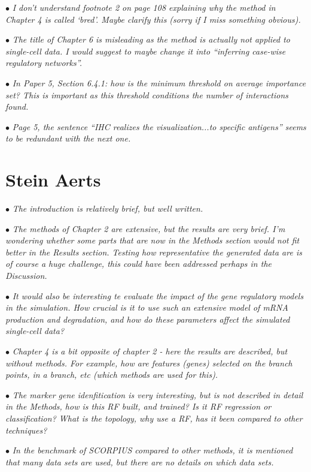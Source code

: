 \documentclass[10pt]{article}
\newcommand{\exam}[2][\  ]{\hspace{0pt}\marginpar{\color{red}#1}$\bullet$ \textit{#2}}
\newcommand{\imp}[1]{{\color{red} #1}}
\newcommand{\bigexclaim}{\raisebox{-0.1em}{\BigTriangleUp}\hspace{-0.32em}\llap{\small\textbf{!}}\hspace{0.32em}}
\newcommand{\tagimp}{\bigexclaim}
\newcommand{\tagtime}{{\Large $\hourglass$}}
\begin{document}
{{\exam{I don’t understand footnote 2 on page 108 explaining why the method in Chapter 4 is called
	‘bred’. Maybe clarify this (sorry if I miss something obvious).}

\exam{The title of Chapter 6 is misleading as the method is actually not applied to single-cell data.
	I would suggest to maybe change it into “inferring case-wise regulatory networks”.}

\exam{In Paper 5, Section 6.4.1: how is the minimum threshold on average importance set? This is
	important as this threshold conditions the number of interactions found.}

\exam{Page 5, the sentence “IHC realizes the visualization...to specific antigens” seems to be
	redundant with the next one.}
 


\section{Stein Aerts}


\exam{The introduction is relatively brief, but well
written.}

\exam{The methods of Chapter 2 are extensive, but the results are very brief. I’m wondering whether
some parts that are now in the Methods section would not fit better in the Results section. Testing how
representative the generated data are is of course a huge challenge, this could have been addressed
perhaps in the Discussion.}


\exam[\tagimp \tagtime]{\imp{It would also be interesting te evaluate the impact of the gene regulatory
models in the simulation. How crucial is it to use such an extensive model of mRNA production and
degradation, and how do these parameters affect the simulated single-cell data?}}


\exam{Chapter 4 is a bit opposite
of chapter 2 - here the results are described, but without methods. For example, how are features
(genes) selected on the branch points, in a branch, etc (which methods are used for this).}

\exam{The marker gene idenfitication is very interesting, but is not described in detail in the Methods, how
is this RF built, and trained? Is it RF regression or classification? What is the topology, why use a RF,
has it been compared to other techniques?}

\exam{In the benchmark of SCORPIUS compared to other
methods, it is mentioned that many data sets are used, but there are no details on which data sets.}

}}
\end{document}
